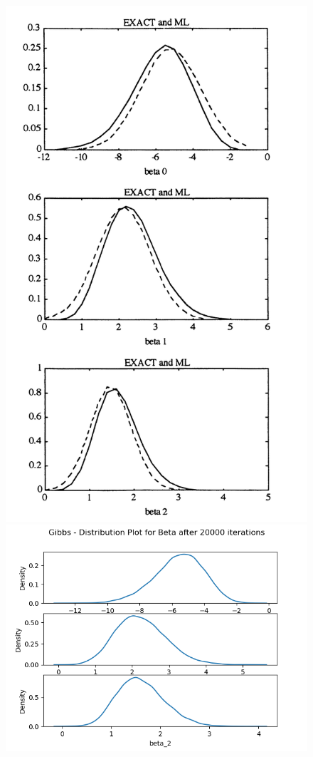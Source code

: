 \documentclass{article}
\begin{document}
\begin{figure}[h!]
    \centering
    \includegraphics[scale=0.5]{images/albert_chibb.png}
    \includegraphics[scale=0.6]{images/dist_gibbs_noinfo_20000_warmup_0.png}

\end{figure}
\end{document}

